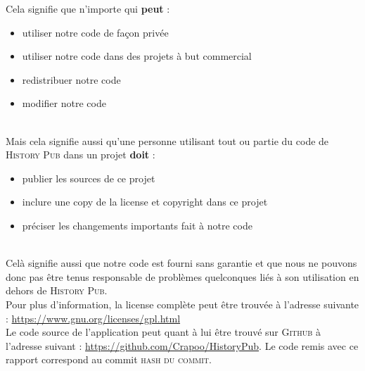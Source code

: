 \documentclass[11pt]{scrreprt}
\begin{document}
    \noindent Cela signifie que n'importe qui \textbf{peut} :
    \begin{itemize}
        \item utiliser notre code de façon privée
        \item utiliser notre code dans des projets à but commercial
        \item redistribuer notre code
        \item modifier notre code
    \end{itemize}
    \hfill\\
    Mais cela signifie aussi qu'une personne utilisant tout ou partie du code de \textsc{History Pub} dans un projet \textbf{doit} :
    \begin{itemize}
        \item publier les sources de ce projet
        \item inclure une copy de la license et copyright dans ce projet
        \item préciser les changements importants fait à notre code
    \end{itemize}
    \hfill\\
    Celà signifie aussi que notre code est fourni sans garantie et que nous ne pouvons donc pas être tenus responsable de problèmes quelconques liés à son utilisation en dehors de \textsc{History Pub}.
    \hfill\\

    \noindent Pour plus d'information, la license complète peut être trouvée à l'adresse suivante : \url{https://www.gnu.org/licenses/gpl.html}\\

    Le code source de l'application peut quant à lui être trouvé sur \textsc{Github} à l'adresse suivant : \url{https://github.com/Crapoo/HistoryPub}. Le code remis avec ce rapport correspond au commit \textsc{hash du commit}.
\end{document}
